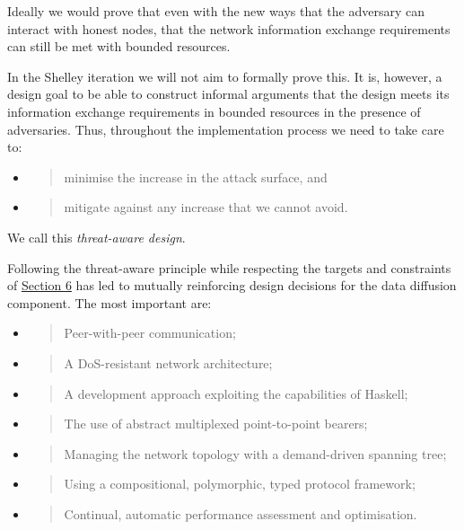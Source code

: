 \documentclass[]{article}
\begin{document}
Ideally we would prove that even with the new ways that the adversary
can interact with honest nodes, that the network information exchange
requirements can still be met with bounded resources.

In the Shelley iteration we will not aim to formally prove this. It is,
however, a design goal to be able to construct informal arguments that
the design meets its information exchange requirements in bounded
resources in the presence of adversaries. Thus, throughout the
implementation process we need to take care to:

\begin{itemize}
\item
  \begin{quote}
  minimise the increase in the attack surface, and
  \end{quote}
\item
  \begin{quote}
  mitigate against any increase that we cannot avoid.
  \end{quote}
\end{itemize}

We call this \emph{threat-aware design}.

Following the threat-aware principle while respecting the targets and
constraints of \protect\hyperlink{overview}{{Section 6}} has led to
mutually reinforcing design decisions for the data diffusion component.
The most important are:

\begin{itemize}
\item
  \begin{quote}
  Peer-with-peer communication;
  \end{quote}
\item
  \begin{quote}
  A DoS-resistant network architecture;
  \end{quote}
\item
  \begin{quote}
  A development approach exploiting the capabilities of Haskell;
  \end{quote}
\item
  \begin{quote}
  The use of abstract multiplexed point-to-point bearers;
  \end{quote}
\item
  \begin{quote}
  Managing the network topology with a demand-driven spanning tree;
  \end{quote}
\item
  \begin{quote}
  Using a compositional, polymorphic, typed protocol framework;
  \end{quote}
\item
  \begin{quote}
  Continual, automatic performance assessment and optimisation.
  \end{quote}
\end{itemize}
\end{document}
